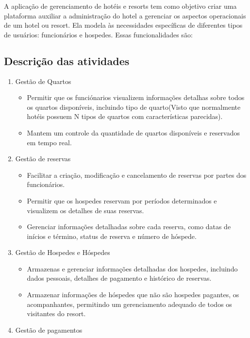 A aplicação de gerenciamento de hotéis e resorts tem como objetivo criar uma plataforma auxiliar a administração do hotel a gerenciar os aspectos operacionais de um hotel ou resort. Ela modela às necessidades específicas de diferentes tipos de usuários: funcionários e hospedes. Essas funcionalidades são:

\subsection{Descrição das atividades}

\begin{enumerate}
    \item Gestão de Quartos
    \begin{itemize}
        \item Permitir que os funciónarios visualizem informações detalhas sobre todos os quartos disponíveis, incluindo tipo de quarto(Visto que normalmente hotéis possuem N tipos de quartos com características parecidas).
        \item Mantem um controle da quantidade de quartos disponíveis e reservados em tempo real.
    \end{itemize}
    \item Gestão de reservas
    \begin{itemize}
        \item Facilitar a criação, modificação e cancelamento de reservas por partes dos funcionários.
        \item Permitir que os hospedes reservam por períodos determinados e visualizem os detalhes de suas reservas.
        \item Gerenciar informações detalhadas sobre cada reserva, como datas de inícios e término, status de reserva e número de hóspede.
    \end{itemize}
    \item Gestão de Hospedes e Hóspedes
    \begin{itemize}
        \item Armazenas e gerenciar informações detalhadas dos hospedes, incluindo dados pessoais, detalhes de pagamento e histórico de reservas.
        \item Armazenar informações de hóspedes que não são hospedes pagantes, os acompanhantes, permitindo um gerenciamento adequado de todos os visitantes do resort.
    \end{itemize}
    \item Gestão de pagamentos
    \begin{itemize}

\end{itemize}
\end{enumerate}
